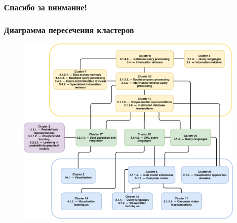 \documentclass[aspectratio=169]{beamer}
\begin{document}
\begin{frame}[c]
\begin{center}
\frametitle{Спасибо за внимание!}

{\LARGE \inserttitle}

\bigskip

{\insertauthor} 

\bigskip\bigskip

{\insertinstitute}

\bigskip\bigskip

{\large \insertdate}
\end{center}
\end{frame}


\frame[plain]{}

\begin{frame}
\frametitle{Диаграмма пересечения кластеров}
\begin{figure}
	\centering
	\includegraphics[width=0.6\linewidth, clip]{images/clusters_interaction}
\end{figure}
\end{frame}
\end{document}
